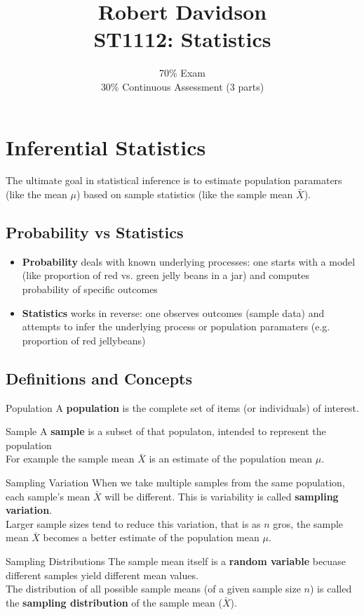 \documentclass[a4paper, 10pt]{article}
\title{
Robert Davidson \\
\textbf{ST1112: Statistics}
}
\author{
70\% Exam\\
30\% Continuous Assessment (3 parts)
}
\date{}       %
\begin{document}
\maketitle
\pagebreak

\tableofcontents
\pagebreak

\section{Inferential Statistics}
The ultimate goal in statistical inference is to estimate population paramaters (like the mean $\mu$) based on sample statistics (like the sample mean $\bar{X}$).
\subsection{Probability vs Statistics}
\begin{itemize}
    \item \textbf{Probability} deals with known underlying processes: one starts with a model (like proportion of red vs. green jelly beans in a jar) and computes probability of specific outcomes 
    \item \textbf{Statistics} works in reverse: one observes outcomes (sample data) and attempts to infer the underlying process or population paramaters (e.g. proportion of red jellybeans)
\end{itemize}
\subsection{Definitions and Concepts}
\begin{definitionbox}{Population}{}
    A \textbf{population} is the complete set of items (or individuals) of interest.
\end{definitionbox}
\begin{definitionbox}{Sample}{}
    A \textbf{sample} is a subset of that populaton, intended to represent the population\\
    
    For example the sample mean $\bar{X}$ is an estimate of the population mean $\mu$.
\end{definitionbox}
\begin{conceptbox}{Sampling Variation}{}
    When we take multiple samples from the same population, each sample's mean $\bar{X}$ will be different. This is variability is called \textbf{sampling variation}. \\

    Larger sample sizes tend to reduce this variation, that is as $n$ gros, the sample mean $\bar{X}$ becomes a better estimate of the population mean $\mu$.
\end{conceptbox}
\begin{conceptbox}{Sampling Distributions}{}
    The sample mean itself is a \textbf{random variable} becuase different samples yield different mean values.\\

    The distribution of all possible sample means (of a given sample size $n$) is called the \textbf{sampling distribution} of the sample mean ($\bar{X}$).
\end{conceptbox}
\end{document}
